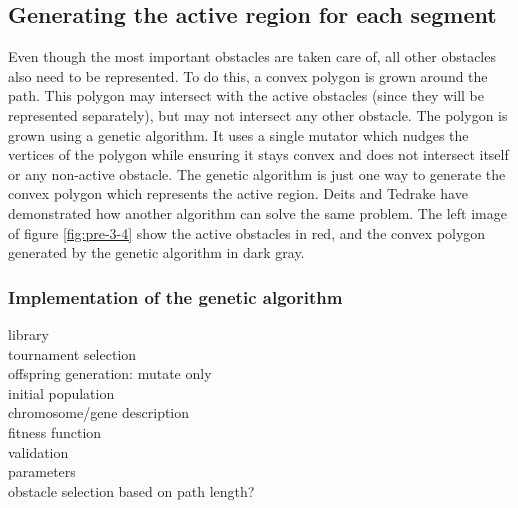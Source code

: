 \subsection{Generating the active region for each segment}
Even though the most important obstacles are taken care of, all other obstacles also need to be represented. To do this, a convex polygon is grown around the path. This polygon may intersect with the active obstacles (since they will be represented separately), but may not intersect any other obstacle. The polygon is grown using a genetic algorithm. It uses a single mutator which nudges the vertices of the polygon while ensuring it stays convex and does not intersect itself or any non-active obstacle. The genetic algorithm is just one way to generate the convex polygon which represents the active region. Deits and Tedrake \cite{Deits2015} have demonstrated how another algorithm can solve the same problem. The left image of figure \ref{fig:pre-3-4} show the active obstacles in red, and the convex polygon generated by the genetic algorithm in dark gray.

\subsubsection{Implementation of the genetic algorithm}
library \\
tournament selection \\
offspring generation: mutate only \\
initial population \\
chromosome/gene description \\
fitness function \\
validation \\
parameters \\
obstacle selection based on path length? \\


